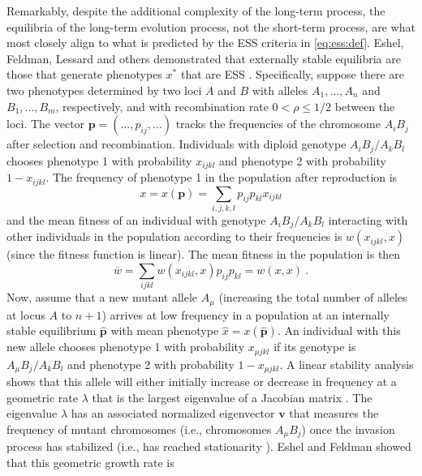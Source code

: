 \documentclass[11pt]{article}
\newcommand{\mean}[1]{\overline{#1}}
\newcommand{\ess}[1]{#1^*}
\newcommand{\fixp}[1]{\hat{#1}}
\renewcommand{\vec}[1]{\symbf{#1}}
\newcommand{\rec}{\rho}
\newcommand{\mut}{\mu}
\begin{document}
Remarkably, despite the additional complexity of the long-term process, the equilibria of the long-term evolution process, not the short-term process, are what most closely align to what is predicted by the ESS criteria in \eqref{eq:ess:def}. Eshel, Feldman, Lessard and others demonstrated that externally stable equilibria are those that generate phenotypes $\ess{x}$ that are ESS \cite{Eshel:Feldman:1984,Liberman:1988,Eshel:1996,Hammerstein:Selten:1994,Hammerstein:1996,Weissing:1996,Eshel:Feldman:1998}. Specifically, suppose there are two phenotypes determined by two loci $A$ and $B$ with alleles $A_{1},\ldots,A_{n}$ and $B_{1},\ldots,B_{m}$, respectively, and with recombination rate $0<\rec\le1/2$ between the loci. The vector $\vec{p} = (\ldots,p_{ij},\ldots)$ tracks the frequencies of the chromosome $A_{i} B_{j}$ after selection and recombination. Individuals with diploid genotype $A_{i}B_{j}/A_{k}B_{l}$ chooses phenotype 1 with probability $x_{ijkl}$ and phenotype 2 with probability $1 - x_{ijkl}$. The frequency of phenotype 1 in the population after reproduction is
\begin{equation*}
  x = x(\vec{p}) = \sum_{i,j,k,l} p_{ij} p_{kl} x_{ijkl}
\end{equation*}
and the mean fitness of an individual with genotype $A_{i}B_{j}/A_{k}B_{l}$ interacting with other individuals in the population according to their frequencies is $w(x_{ijkl}, x)$ (since the fitness function is linear). The mean fitness in the population is then
\begin{equation*}
  \mean{w} = \sum_{ijkl} w(x_{ijkl}, x) p_{ij} p_{kl} = w(x, x) \: .
\end{equation*}
Now, assume that a new mutant allele $A_{\mut}$ (increasing the total number of alleles at locus $A$ to $n+1$) arrives at low frequency in a population at an internally stable equilibrium $\fixp{\vec{p}}$ with mean phenotype $\fixp{x} = x(\fixp{\vec{p}})$. An individual with this new allele chooses phenotype 1 with probability $x_{\mut jkl}$ if its genotype is $A_{\mut}B_{j}/A_{k}B_{l}$ and phenotype 2 with probability $1 - x_{\mut jkl}$. A linear stability analysis shows that this allele will either initially increase or decrease in frequency at a geometric rate $\lambda$ that is the largest eigenvalue of a Jacobian matrix \cite{Edelstein-Keshet:2005}. The eigenvalue $\lambda$ has an associated normalized eigenvector $\vec{v}$ that measures the frequency of mutant chromosomes (i.e., chromosomes $A_{\mut} B_{j}$) once the invasion process has stabilized (i.e., has reached stationarity \cite{Caswell:2006}). Eshel and Feldman \cite{Eshel:Feldman:1984,Eshel:Feldman:1998} showed that this geometric growth rate is
\end{document}
